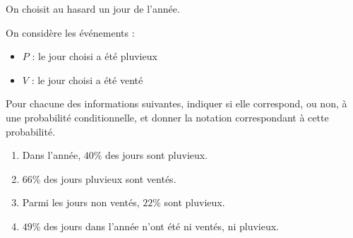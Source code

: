 \begin{exo}
	On choisit au hasard un jour de l'année.

	On considère les événements :
	\begin{itemize}
		\item $P$ : \og{} le jour choisi a été pluvieux \fg{}
		\item $V$ : \og{} le jour choisi a été venté \fg{}
	\end{itemize}
	Pour chacune des informations suivantes, indiquer si elle correspond, ou non, à une probabilité conditionnelle, et donner la notation correspondant à cette probabilité.
	\begin{enumerate}
		\item Dans l'année, $40$\% des jours sont pluvieux.
		\item $66$\% des jours pluvieux sont ventés.
		\item Parmi les jours non ventés, $22$\% sont pluvieux.
		\item $49$\% des jours dans l'année n'ont été ni ventés, ni pluvieux.
	\end{enumerate}
\end{exo}
